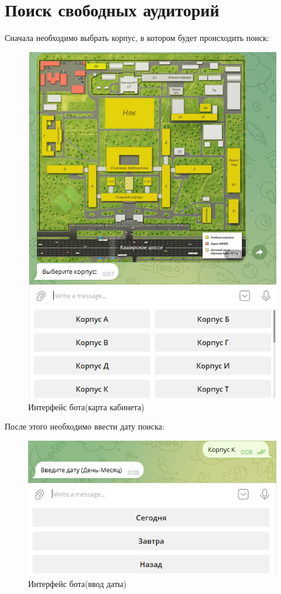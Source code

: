\section*{Поиск свободных аудиторий}
Сначала необходимо выбрать корпус, в котором будет происходить поиск:
\begin{figure}[h]
    \centering
    \includegraphics[scale=0.8]{img/2}
    \caption{Интерфейс бота(карта кабинета)}
    \label{fig:cp}
\end{figure}

После этого необходимо ввести дату поиска:
\begin{figure}[h]
    \centering
    \includegraphics[scale=0.8]{img/3}
    \caption{Интерфейс бота(ввод даты)}
    \label{fig:cp}
\end{figure}

